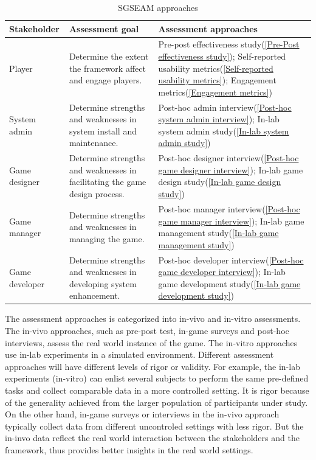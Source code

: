 \documentclass[11pt,oneside]{book}
\newcommand\tabhead[1]{\small\textbf{#1}}
\begin{document}
\begin{table}[ht!]
  \centering
  \begin{tabular}{|p{}|p{}|p{}|}
    \hline
    \tabhead{Stakeholder}&
    \tabhead{Assessment goal}&
    \tabhead{Assessment approaches} \\
    \hline
    Player&
    Determine the extent the framework affect and engage players.&
    	Pre-post effectiveness study(\ref{Pre-Post effectiveness study});\newline
	Self-reported usability metrics(\ref{Self-reported usability metrics});\newline
	Engagement metrics(\ref{Engagement metrics}) \\
    \hline
    System admin&
    Determine strengths and weaknesses in system install and maintenance.&
    	Post-hoc admin interview(\ref{Post-hoc system admin interview});\newline
	In-lab system admin study(\ref{In-lab system admin study}) \\
    \hline
    Game designer&
    Determine strengths and weaknesses in facilitating the game design process.&
    	Post-hoc designer interview(\ref{Post-hoc game designer interview});\newline
	In-lab game design study(\ref{In-lab game design study})\\
    \hline
    Game manager&
    Determine strengths and weaknesses in managing the game.&
    	Post-hoc manager interview(\ref{Post-hoc game manager interview});\newline
	In-lab game management study(\ref{In-lab game management study})\\
    \hline
    Game developer&
    Determine strengths and weaknesses in developing system enhancement.&
    	Post-hoc developer interview(\ref{Post-hoc game developer interview});\newline
	In-lab game development study(\ref{In-lab game development study}) \\
    \hline
  \end{tabular}
  \caption{SGSEAM approaches}
  \label{table:approaches}
\end{table}

The assessment approaches is categorized into in-vivo and in-vitro assessments. The in-vivo approaches, 
such as pre-post test, in-game surveys and post-hoc interviews, assess the real world instance of the game. 
The in-vitro approaches use in-lab experiments in a simulated environment. Different assessment
approaches will have different levels of rigor or validity. For example, the in-lab experiments (in-vitro) can 
enlist several subjects to perform the same pre-defined tasks and collect comparable data in a more 
controlled setting. It is rigor because of the generality achieved from the larger population of
participants under study. On the other hand, in-game surveys or interviews in the in-vivo approach typically 
collect data from different uncontroled settings with less rigor. But the in-invo data reflect the real world 
interaction between the stakeholders and the framework, thus provides better insights in the real world settings.
\end{document}

